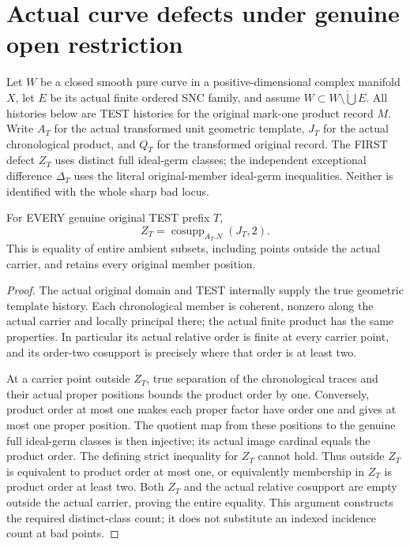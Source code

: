 \section{Actual curve defects under genuine open restriction}

Let $W$ be a closed smooth pure curve in a positive-dimensional complex
manifold $X$, let $E$ be its actual finite ordered SNC family, and assume
$W\subset\overline{W\setminus\bigcup E}$. All histories below are TEST
histories for the original mark-one product record $M$.
Write $A_T$ for the actual transformed unit geometric template, $J_T$
for the actual chronological product, and $Q_T$ for the transformed
original record. The FIRST defect $Z_T$ uses distinct full ideal-germ
classes; the independent exceptional difference $\Delta_T$ uses the
literal original-member ideal-germ inequalities. Neither is identified
with the whole sharp bad locus.

\begin{theorem}
\label{hir:sharp-original-curve-first-defect-actual-product-second-cut}
\leanok
For EVERY genuine original TEST prefix $T$,
\[
 Z_T=\operatorname{cosupp}_{A_T.N}(J_T,2).
\]
This is equality of entire ambient subsets, including points outside the
actual carrier, and retains every original member position.
\end{theorem}
\begin{proof}
The actual original domain and TEST internally supply the true geometric
template history. Each chronological member is coherent, nonzero along
the actual carrier and locally principal there; the actual finite product
has the same properties. In particular its actual relative order is
finite at every carrier point, and its order-two cosupport is precisely
where that order is at least two.

At a carrier point outside $Z_T$, true separation of the chronological
traces and their actual proper positions bounds the product order by one.
Conversely, product order at most one makes each proper factor have order
one and gives at most one proper position. The quotient map from these
positions to the genuine full ideal-germ classes is then injective; its
actual image cardinal equals the product order. The defining strict
inequality for $Z_T$ cannot hold. Thus outside $Z_T$ is equivalent to
product order at most one, or equivalently membership in $Z_T$ is product
order at least two. Both $Z_T$ and the actual relative cosupport are empty
outside the actual carrier, proving the entire equality. This argument
constructs the required distinct-class count; it does not substitute an
indexed incidence count at bad points.
\end{proof}

